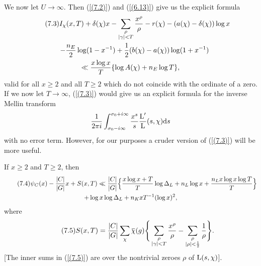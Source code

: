 \documentclass[./main]{subfiles}
\begin{document}
We now let $U \to  \infty$. Then (\ref{(7.2)}) and (\ref{(6.13)}) give us the explicit formula 
\begin{multline}\tag{7.3}\label{(7.3)}
    I_{\chi}(x,T) + \delta(\chi)x - \sum_{\substack{\rho \\ |\gamma| < T}} \frac{x^{\rho}}{\rho} - r(\chi) - (a(\chi) - \delta(\chi))\log x \\ \hfill- \frac{n_E}{2} \log(1 - x^{-1}) + \frac{1}{2}(b(\chi)-a(\chi))\log(1+x^{-1}) \quad\quad\quad
    \\
    \Vinogradov \frac{x \log x}{T} \{\log A(\chi) + n_E \log T\},
\end{multline}
valid for all $x \geq 2$ and all $T \geq 2$ which do not coincide with the ordinate of a zero. If we now let $T \to \infty$, (\ref{(7.3)}) would give us an explicit formula for the inverse Mellin transform 
\[ \frac{1}{2\pi i} \int_{\sigma_{0}-i\infty}^{\sigma_{0}+ i \infty} \frac{x^s}{s}\frac{\operatorname{L}'}{\operatorname{L}}(s, \chi) \mathrm{d}{s}
\]
with no error term. However, for our purposes a cruder version of (\ref{(7.3)}) will be more useful.
\begin{theorem}\label{7.1}\label{07-THM-7.1}
If $x \geq 2$ and $T \geq 2$, then 
\begin{multline}\tag{7.4}\label{(7.4)} 
\psi_{C}(x) - \frac{|C|}{|G|}x  + S(x,T)
\ll \frac{|C|}{|G|} \Big\{\frac{x \log x + T}{T}\log \Delta_L  + n_L \log x+ \frac{n_L x \log x \log T}{T} \Big\}\\ + \log x \log \Delta_L  + n_KxT^{-1}(\log x)^2,
\end{multline}
where 
\[\tag{7.5}\label{(7.5)} S(x, T) = \frac{|C|}{|G|} \sum_{\chi} \xoverline{\chi}(g) \Bigg\{ \sum_{\substack{\rho \\ |\gamma| < T}} \frac{x^\rho}{\rho} - \sum_{\substack{\rho \\ |\rho| < \frac{1}{2}}} \frac{1}{\rho} \Bigg\}.
\]
[The inner sums in (\ref{(7.5)}) are over the nontrivial zeroes $\rho$ of $\operatorname{L}(s, \chi)$]. 
\end{theorem}
\end{document}
